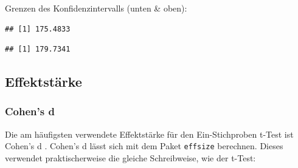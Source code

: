 \documentclass[
]{book}
\newenvironment{Shaded}{\begin{snugshade}}{\end{snugshade}}
\newcommand{\AttributeTok}[1]{\textcolor[rgb]{0.13,0.29,0.53}{#1}}
\newcommand{\ConstantTok}[1]{\textcolor[rgb]{0.56,0.35,0.01}{#1}}
\newcommand{\DecValTok}[1]{\textcolor[rgb]{0.00,0.00,0.81}{#1}}
\newcommand{\FloatTok}[1]{\textcolor[rgb]{0.00,0.00,0.81}{#1}}
\newcommand{\FunctionTok}[1]{\textcolor[rgb]{0.13,0.29,0.53}{\textbf{#1}}}
\newcommand{\NormalTok}[1]{#1}
\newcommand{\SpecialCharTok}[1]{\textcolor[rgb]{0.81,0.36,0.00}{\textbf{#1}}}
\newcommand{\StringTok}[1]{\textcolor[rgb]{0.31,0.60,0.02}{#1}}
\begin{document}
Grenzen des Konfidenzintervalls (unten \& oben):

\begin{Shaded}
\end{Shaded}

\begin{verbatim}
## [1] 175.4833
\end{verbatim}

\begin{Shaded}
\end{Shaded}

\begin{verbatim}
## [1] 179.7341
\end{verbatim}

\subsection{Effektstärke}\label{effektstuxe4rke}

\subsubsection{Cohen's d}\label{cohens-d}

Die am häufigsten verwendete Effektstärke für den Ein-Stichproben t-Test ist Cohen's d \citet{cohen1988statistical}.
Cohen's d lässt sich mit dem Paket \texttt{effsize} berechnen. Dieses verwendet praktischerweise die gleiche Schreibweise, wie der t-Test:

\begin{Shaded}
\end{Shaded}
\end{document}

